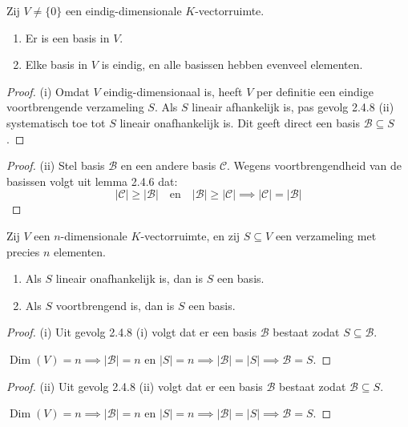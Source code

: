 \begin{gevolg}[2.4.9]
    Zij $V \neq \{0\}$ een eindig-dimensionale $K$-vectorruimte.
    \begin{enumerate}
        \item[(i)] Er is een basis in $V$.
        \item[(ii)] Elke basis in $V$ is eindig, en alle basissen hebben evenveel elementen.
    \end{enumerate}
\end{gevolg}
\begin{proof}(i)
    Omdat \(V\) eindig-dimensionaal is, heeft \(V\) per definitie een eindige voortbrengende verzameling \(S\).
    Als \(S\) lineair afhankelijk is, pas gevolg 2.4.8 (ii) systematisch toe tot \(S\) lineair onafhankelijk is.
    Dit geeft direct een basis \(\mathcal{B} \subseteq S\).
\end{proof}
\begin{proof}(ii)
    Stel basis \(\mathcal{B}\) en een andere basis \(\mathcal{C}\).
    Wegens voortbrengendheid van de basissen volgt uit lemma 2.4.6 dat:
      \[
      |\mathcal{C}| \geq |\mathcal{B}| \quad\text{en}\quad |\mathcal{B}| \geq |\mathcal{C}|
      \implies |\mathcal{C}| = |\mathcal{B}|
      \]
\end{proof}

\begin{stelling}[2.4.12]
    Zij $V$ een $n$-dimensionale $K$-vectorruimte, en zij $S \subseteq V$ een verzameling met precies $n$ elementen.
    \begin{enumerate}
        \item[(i)] Als $S$ lineair onafhankelijk is, dan is $S$ een basis.
        \item[(ii)] Als $S$ voortbrengend is, dan is $S$ een basis.
    \end{enumerate}
\end{stelling}
\begin{proof}(i)
    Uit gevolg 2.4.8 (i) volgt dat er een basis \(\mathcal{B}\) bestaat zodat \(S \subseteq \mathcal{B}\).

    \(\operatorname{Dim}(V) = n \implies |\mathcal{B}| = n\) en \(|S| = n \implies |\mathcal{B}| = |S| \implies \mathcal{B} = S\).
\end{proof}
\begin{proof}(ii)
    Uit gevolg 2.4.8 (ii) volgt dat er een basis \(\mathcal{B}\) bestaat zodat \( \mathcal{B} \subseteq S\).

    \(\operatorname{Dim}(V) = n \implies |\mathcal{B}| = n \) en \(|S| = n \implies |\mathcal{B}| = |S| \implies \mathcal{B} = S\).
\end{proof}

